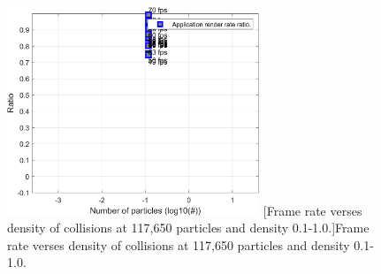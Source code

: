 \begin{figure}[h]
\centering
\includegraphics[width=2.97in]{../plots/Perf_RCPCD_Density0021.png}
[Frame rate verses density of collisions at 117,650 particles and density 0.1-1.0.]{Frame rate verses density of collisions at 117,650 particles and density 0.1-1.0.}
\label{fig:Perf_RCPCD_Density002}
\end{figure}
